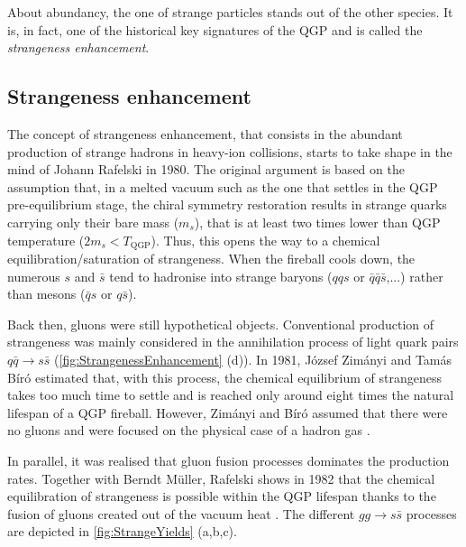 About abundancy, the one of strange particles stands out of the other species. It is, in fact, one of the historical key signatures of the QGP and is called the \textit{strangeness enhancement}. 

\subsection{Strangeness enhancement}
\label{subsec:StrangenessEnhanement}

The concept of strangeness enhancement, that consists in the abundant production of strange hadrons in heavy-ion collisions, starts to take shape in the mind of Johann Rafelski in 1980. The original argument is based on the assumption that, in a melted vacuum such as the one that settles in the QGP pre-equilibrium stage, the chiral symmetry restoration results in strange quarks carrying only their bare mass ($m_{s}$), that is at least two times lower than QGP temperature ($2 m_{s} < T_{\textrm{QGP}}$). Thus, this opens the way to a chemical equilibration/saturation of strangeness. When the fireball cools down, the numerous $s$ and $\bar{s}$ tend to hadronise into strange baryons ($qqs$ or $\bar{q}\bar{q}\bar{s}$,...) rather than mesons ($\bar{q}s$ or $q\bar{s}$).

Back then, gluons were still hypothetical objects. Conventional production of strangeness was mainly considered in the annihilation process of light quark pairs $q\bar{q} \rightarrow s \bar{s}$ (\fig \ref{fig:StrangenessEnhancement} (d)). In 1981, J\'ozsef Zim\'anyi and Tam\'as B\'ir\'o estimated that, with this process, the chemical equilibrium of strangeness takes too much time to settle and is reached only around eight times the natural lifespan of a QGP fireball. However, Zim\'anyi and B\'ir\'o assumed that there were no gluons and were focused on the physical case of a hadron gas \cite{rafelskiStrangenessEnhancement2008}.

In parallel, it was realised that gluon fusion processes dominates the production rates. Together with Berndt M\"{u}ller, Rafelski shows in 1982 that the chemical equilibration of strangeness is possible within the QGP lifespan thanks to the fusion of gluons created out of the vacuum heat  \cite{rafelskiStrangenessProductionQuarkGluon1982}. The different $gg \rightarrow s\bar{s}$ processes are depicted in \fig\ref{fig:StrangeYields} (a,b,c).


